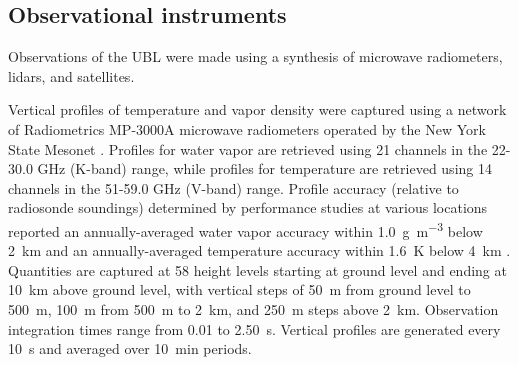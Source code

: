 
\subsection{Observational instruments}
Observations of the UBL were made using a synthesis of microwave radiometers, lidars, and satellites. 

Vertical profiles of temperature and vapor density were captured using a network of Radiometrics MP-3000A microwave radiometers \citep{hewison2003} operated by the New York State Mesonet \citep{brotzge2020}. Profiles for water vapor are retrieved using 21 channels in the 22-30.0 GHz (K-band) range, while profiles for temperature are retrieved using 14 channels in the 51-59.0 GHz (V-band) range. Profile accuracy (relative to radiosonde soundings) determined by performance studies at various locations reported an annually-averaged water vapor accuracy within \SI{1.0}{\gram\per\cubic\meter} below \SI{2}{\kilo\meter} and an annually-averaged temperature accuracy within \SI{1.6}{\kelvin} below \SI{4}{\kilo\meter} \citep{guldner2001, sanchez2013}. Quantities are captured at 58 height levels starting at ground level and ending at \SI{10}{\kilo\meter} above ground level, with vertical steps of \SI{50}{\meter} from ground level to \SI{500}{\meter}, \SI{100}{\meter} from \SI{500}{\meter} to \SI{2}{\kilo\meter}, and \SI{250}{\meter} steps above \SI{2}{\kilo\meter}. Observation integration times range from 0.01 to \SI{2.50}{\second}. Vertical profiles are generated every \SI{10}{\second} and averaged over \SI{10}{\minute} periods.

